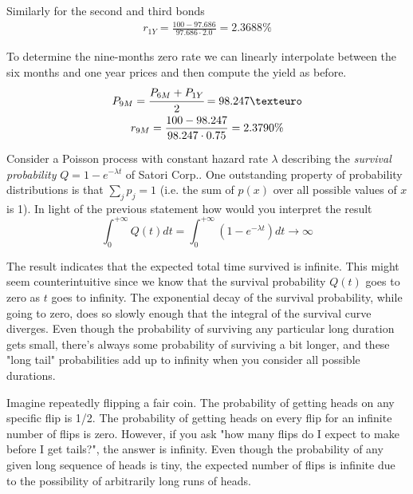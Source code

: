 \documentclass[12pt,a4paper]{exam}
\begin{document}
\begin{questions}
\begin{solution}
Similarly for the second and third bonds
\begin{equation*}
  \begin{gathered}
    r_{1Y} = \frac{100 - 97.686}{97.686\cdot2.0} = 2.3688\%
 \end{gathered}   
\end{equation*}

To determine the nine-months zero rate we can linearly interpolate between the six months and one year prices and 
then compute the yield as before.
\begin{equation*}
  \begin{gathered}
    P_{9M} = \cfrac{P_{6M} + P_{1Y}}{2} = 98.247€\\
    r_{9M} = \frac{100 - 98.247}{98.247\cdot0.75} = 2.3790\%
  \end{gathered}
\end{equation*}
\end{solution}


\question 
Consider a Poisson process with constant hazard rate $\lambda$ describing the \emph{survival probability} $Q=1-e^{-\lambda t}$ of Satori Corp.. One outstanding property of probability distributions is that $\sum_j p_j = 1$ (i.e. the sum of $p(x)$ over all possible values of $x$ is 1). In light of the previous statement how would you interpret the result
\begin{equation*}
\int_0^{+\infty} Q(t) dt = \int_0^{+\infty}\left(1- e^{-\lambda t}\right) dt \rightarrow \infty
\end{equation*}
\fillwithlines{5cm}

\begin{solution}
The result indicates that the expected total time survived is infinite. This might seem counterintuitive since we know that the survival probability $Q(t)$ goes to zero as $t$ goes to infinity.
The exponential decay of the survival probability, while going to zero, does so slowly enough that the integral of the 
survival curve diverges.  
Even though the probability of surviving any particular long duration gets small, 
there's always some probability of surviving a bit longer, and these "long tail" probabilities add up to infinity when 
you consider all possible durations.

Imagine repeatedly flipping a fair coin. The probability of getting heads on any specific flip is 1/2.  
The probability of getting heads on every flip for an infinite number of flips is zero.  However, 
if you ask "how many flips do I expect to make before I get tails?", the answer is infinity.  
Even though the probability of any given long sequence of heads is tiny, the expected number of flips is infinite 
due to the possibility of arbitrarily long runs of heads.


\end{solution}
\end{questions}
\end{document}
